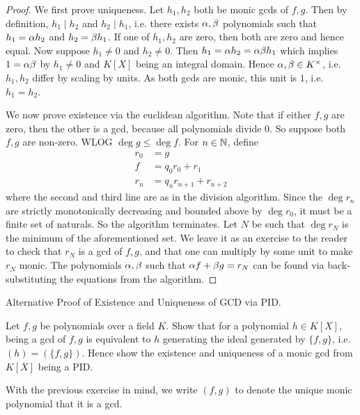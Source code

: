 \documentclass[../book.tex]{subfiles}
\begin{document}
\begin{proof}
    We first prove uniqueness. 
    Let $h_1, h_2$ both be monic gcds of $f, g$. 
    Then by definition, $h_1 \mid h_2$ and $h_2 \mid h_1$, i.e.
    there exists $\alpha, \beta$ polynomials such that 
    $h_1 = \alpha h_2$ and $h_2=\beta h_1$.
    If one of $h_1, h_2$ are zero, then both are zero and hence equal.
    Now suppose $h_1 \neq 0$ and $h_2 \neq 0$. 
    Then $h_1 = \alpha h_2 = \alpha \beta h_1$ which implies $1 = \alpha \beta$ 
    by $h_1 \neq 0$ and $K[X]$ being an integral domain. 
    Hence $\alpha, \beta \in K^\times$, i.e. $h_1, h_2$ differ by scaling by units.
    As both gcds are monic, this unit is $1$, i.e. $h_1 = h_2$.
    
    We now prove existence via the euclidean algorithm.
    Note that if either $f, g$ are zero, then the other is a gcd, 
    because all polynomials divide $0$. 
    So suppose both $f, g$ are non-zero. WLOG $\deg g \leq \deg f$.
    For $n \in \mathbb{N}$, define \begin{align*}
        r_0 &= g \\
        f &= q_0 r_0 + r_1 \\
        r_n &= q_n r_{n+1} + r_{n+2}
    \end{align*}
    where the second and third line are as in the division algorithm. 
    Since the $\deg r_n$ are strictly monotonically decreasing and
    bounded above by $\deg r_0$, it must be a finite set of naturals.
    So the algorithm terminates. 
    Let $N$ be such that $\deg r_N$ is the minimum of the aforementioned set. 
    We leave it as an exercise to the reader to check that
    $r_N$ is a gcd of $f, g$,
    and that one can multiply by some unit to make $r_N$ monic.
    The polynomials $\alpha, \beta$ such that $\alpha f + \beta g = r_N$ 
    can be found via back-substituting the equations from the algorithm. 
\end{proof}
\begin{ex} Alternative Proof of Existence and Uniqueness of GCD via PID.

    Let $f, g$ be polynomials over a field $K$.
    Show that for a polynomial $h \in K[X]$, 
    being a gcd of $f, g$ is equivalent to 
    $h$ generating the ideal generated by $\{f, g\}$, i.e. $(h) = (\{f, g\})$.
    Hence show the existence and uniqueness of a monic gcd from $K[X]$ being a PID.
\end{ex}
With the previous exercise in mind, 
we write $(f,g)$ to denote the unique monic polynomial that it is a gcd.
\end{document}
